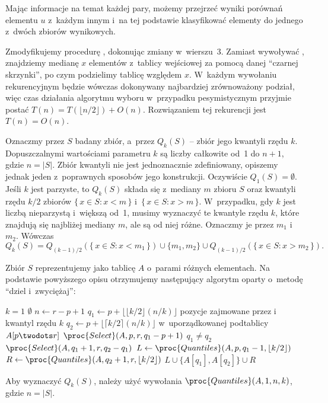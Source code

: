 Mając informacje na temat każdej pary, możemy przejrzeć wyniki porównań elementu $u$ z~każdym innym i~na tej podstawie klasyfikować elementy do jednego z~dwóch zbiorów wynikowych.

\exercise %
Zmodyfikujemy procedurę , dokonując zmiany w~wierszu~3. Zamiast wywoływać , znajdziemy medianę $x$ elementów z~tablicy wejściowej za pomocą danej ``czarnej skrzynki'', po czym podzielimy tablicę względem $x$. W~każdym wywołaniu rekurencyjnym będzie wówczas dokonywany najbardziej zrównoważony podział, więc czas działania algorytmu wyboru w~przypadku pesymistycznym przyjmie postać $T(n)=T(\lfloor n/2\rfloor)+O(n)$. Rozwiązaniem tej rekurencji jest $T(n)=O(n)$.

\exercise %
Oznaczmy przez $S$ badany zbiór, a~przez $Q_k(S)$ -- zbiór jego kwantyli rzędu $k$. Dopuszczalnymi wartościami parametru $k$ są liczby całkowite od~1 do $n+1$, gdzie $n=|S|$. Zbiór kwantyli nie jest jednoznacznie zdefiniowany, opiszemy jednak jeden z~poprawnych sposobów jego konstrukcji. Oczywiście $Q_1(S)=\emptyset$. Jeśli $k$ jest parzyste, to $Q_k(S)$ składa się z~mediany $m$ zbioru $S$ oraz kwantyli rzędu $k/2$ zbiorów $\{\,x\in S:x<m\,\}$ i~$\{\,x\in S:x>m\,\}$. W~przypadku, gdy $k$ jest liczbą nieparzystą i~większą od~1, musimy wyznaczyć te kwantyle rzędu $k$, które znajdują się najbliżej mediany $m$, ale są od niej różne. Oznaczmy je przez $m_1$ i~$m_2$. Wówczas
\[
	Q_k(S) = Q_{(k-1)/2}(\{\,x\in S:x<m_1\,\})\cup\{m_1,m_2\}\cup Q_{(k-1)/2}(\{\,x\in S:x>m_2\,\}).
\]

Zbiór $S$ reprezentujemy jako tablicę $A$ o~parami różnych elementach. Na podstawie powyższego opisu otrzymujemy następujący algorytm oparty o~metodę ``dziel i~zwyciężaj'':
\begin{codebox}
\li	\If $k=1$
\li		\Then \Return $\emptyset$
		\End
\li	$n\gets r-p+1$
\li	$q_1\gets p+\lfloor\lfloor k/2\rfloor(n/k)\rfloor$ \>\>\>\>\>\>\Comment pozycje zajmowane przez  i~ kwantyl rzędu $k$
\li	$q_2\gets p+\lfloor\lceil k/2\rceil(n/k)\rfloor$ \>\>\>\>\>\>\>w~uporządkowanej podtablicy $A[p\twodots r]$
\li	$\proc{Select}(A,p,r,q_1-p+1)$
\li	\If $q_1\ne q_2$
\li		\Then $\proc{Select}(A,q_1+1,r,q_2-q_1)$ \label{li:quantiles-second-select}
		\End
\li	$L\gets\proc{Quantiles}(A,p,q_1-1,\lfloor k/2\rfloor)$
\li	$R\gets\proc{Quantiles}(A,q_2+1,r,\lfloor k/2\rfloor)$
\li	\Return $L\cup\{A[q_1],A[q_2]\}\cup R$
\end{codebox}
Aby wyznaczyć $Q_k(S)$, należy użyć wywołania $\proc{Quantiles}(A,1,n,k)$, gdzie $n=|S|$.

